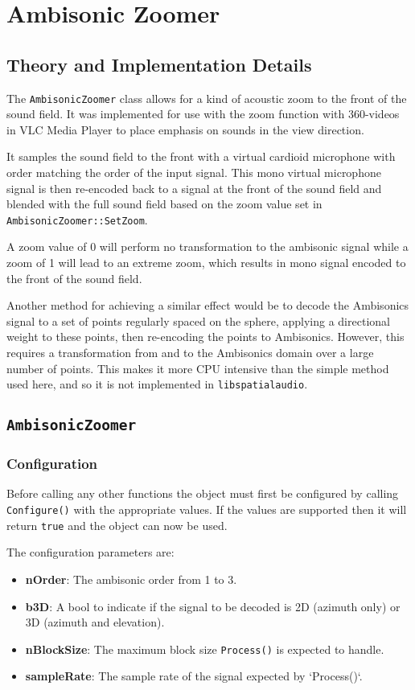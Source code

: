 \documentclass[12pt]{report}
\newcommand{\code}[1]{\texttt{#1}}
\begin{document}
\section{Ambisonic Zoomer}\label{AmbiZoomer}
\subsection{Theory and Implementation Details}

The \code{AmbisonicZoomer} class allows for a kind of acoustic zoom to the front of the sound field.
It was implemented for use with the zoom function with 360-videos in VLC Media Player to place emphasis on sounds in the view direction.

It samples the sound field to the front with a virtual cardioid microphone with order matching the order of the input signal.
This mono virtual microphone signal is then re-encoded back to a signal at the front of the sound field and blended with the full sound field based on the zoom value set in \code{AmbisonicZoomer::SetZoom}.

A zoom value of 0 will perform no transformation to the ambisonic signal while a zoom of 1 will lead to an extreme zoom, which results in mono signal encoded to the front of the sound field.

Another method for achieving a similar effect would be to decode the Ambisonics signal to a set of points regularly spaced on the sphere, applying a directional weight to these points, then re-encoding the points to Ambisonics.
However, this requires a transformation from and to the Ambisonics domain over a large number of points. This makes it more CPU intensive than the simple method used here, and so it is not implemented in \code{libspatialaudio}.

\subsection{\code{AmbisonicZoomer}}

\subsubsection{Configuration}

Before calling any other functions the object must first be configured by calling \code{Configure()} with the appropriate values. If the values are supported then it will return \code{true} and the object can now be used.

The configuration parameters are:
\begin{itemize}
    \item \textbf{nOrder}: The ambisonic order from 1 to 3.
    \item \textbf{b3D}: A bool to indicate if the signal to be decoded is 2D (azimuth only) or 3D (azimuth and elevation).
    \item \textbf{nBlockSize}: The maximum block size \code{Process()} is expected to handle.
    \item \textbf{sampleRate}: The sample rate of the signal expected by `Process()`.
\end{itemize}
\end{document}
